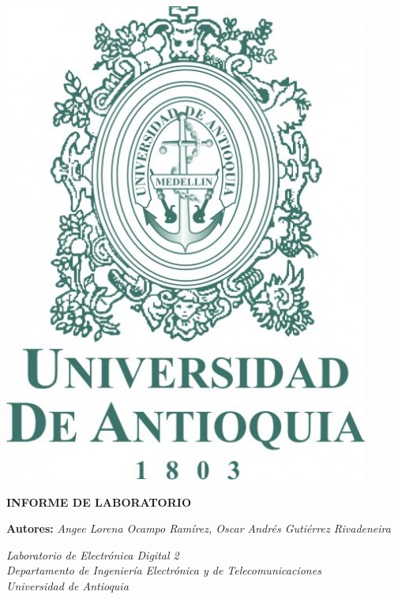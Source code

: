 \onecolumn\begin{@twocolumntrue}
    \begin{minipage}{0.15\textwidth}
    {
        \includegraphics[scale=0.20]{images/UdeA.jpg}
    } 
    \end{minipage}
    \vspace{10pt}
    \begin{minipage}{0.75\textwidth}
        \begin{center}
            \vspace{2mm}
        
            \Large{\textbf{INFORME DE LABORATORIO}}
            \vspace{2mm}

            \large{\textbf{Autores: }\textit{Angee Lorena Ocampo Ramírez, Oscar Andrés Gutiérrez Rivadeneira}} 
            \vspace{2mm}
    
            \small{\textit{Laboratorio de Electrónica Digital 2 \\
            Departamento de Ingeniería Electrónica y de Telecomunicaciones \\ Universidad de Antioquia}}
            \vspace{2mm}

            \footnotesize   
        \end{center}
    \end{minipage}
\end{@twocolumntrue}